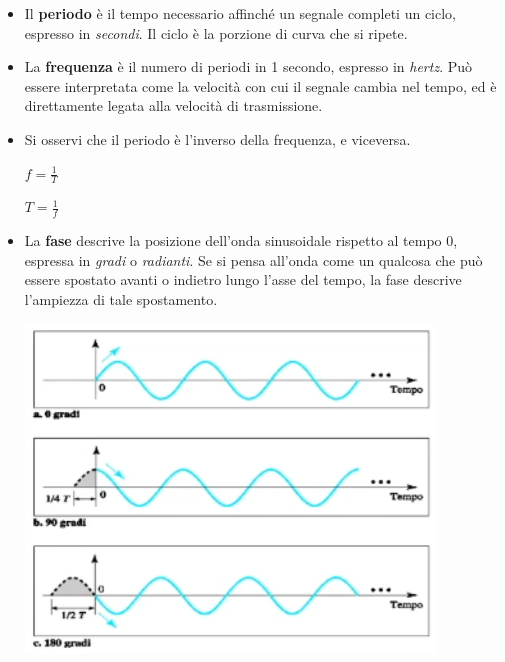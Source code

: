             \begin{itemize}
            
            \item 
                Il \textbf{periodo} è il tempo necessario affinché un segnale completi un ciclo, espresso in \textit{secondi}. Il ciclo è la porzione di curva che si ripete.
            
            \item
                La \textbf{frequenza} è il numero di periodi in 1 secondo, espresso in \textit{hertz}. Può essere interpretata come la velocità con cui il segnale cambia nel tempo, ed è direttamente legata alla velocità di trasmissione.
            
            \item
                Si osservi che il periodo è l'inverso della frequenza, e viceversa.
            
                \begin{center}
                    \(f=\frac{1}{T}\)
                    
                    \(T=\frac{1}{f}\)
                \end{center}
            
            \item
                La \textbf{fase} descrive la posizione dell'onda sinusoidale rispetto al tempo 0, espressa in \textit{gradi} o \textit{radianti}. Se si pensa all'onda come un qualcosa che può essere spostato avanti o indietro lungo l'asse del tempo, la fase descrive l'ampiezza di tale spostamento.
            
                \begin{center}
                    \includegraphics[scale=0.45]{images/Fase.png}
                \end{center}
            

\end{itemize}
